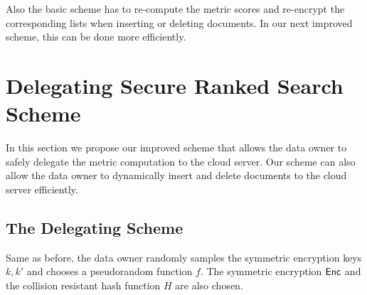 \documentclass{IEEEtran}
\begin{document}
Also the basic scheme has to re-compute the metric scores and re-encrypt the corresponding lists when inserting or deleting documents. In our next improved scheme, this can be done more efficiently.


\section{Delegating Secure Ranked Search Scheme}
In this section we propose our improved scheme that allows the data owner to safely delegate the metric computation to the cloud server. Our scheme can also allow the data owner to dynamically insert and delete documents to the cloud server efficiently.

\subsection{The Delegating Scheme}
Same as before, the data owner randomly samples the symmetric encryption keys $k, k'$ and chooses a pseudorandom function $f$. The symmetric encryption $\textsf{Enc}$ and the collision resistant hash function $H$ are also chosen. 
\end{document}
